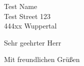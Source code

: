 \documentclass[10pt,a4paper]{scrlttr2}
\begin{document}
\begin{letter}{Test Name\\ Test Street 123\\444xx Wuppertal}
\opening{Sehr geehrter Herr}
		\closing{Mit freundlichen Grüßen}
    
\end{letter}
\end{document}
